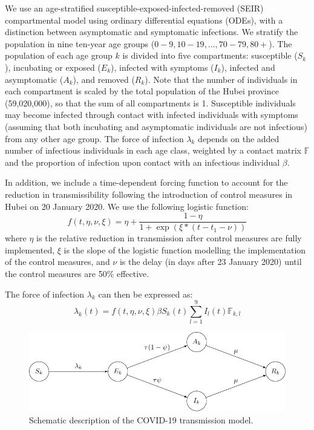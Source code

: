 \documentclass{article}
\begin{document}
We use an age-stratified susceptible-exposed-infected-removed (SEIR) compartmental model using ordinary differential equations (ODEs), with a distinction between asymptomatic and symptomatic infections. 
We stratify the population in nine ten-year age groups ($0-9, 10-19, \ldots, 70-79, 80+$). 
The population of each age group $k$ is divided into five compartments: susceptible ($S_k$), incubating or exposed ($E_k$), infected with symptoms ($I_k$), infected and asymptomatic ($A_k$), and removed ($R_k$).
Note that the number of individuals in each compartment is scaled by the total population of the Hubei province (59,020,000), so that the sum of all compartments is 1.
Susceptible individuals may become infected through contact with infected individuals with symptoms (assuming that both incubating and asymptomatic individuals are not infectious) from any other age group.
The force of infection $\lambda_k$ depends on the added number of infectious individuals in each age class, weighted by a contact matrix $\mathds{F}$ and the proportion of infection upon contact with an infectious individual $\beta$.

In addition, we include a time-dependent forcing function to account for the reduction in transmissibility following the introduction of control measures in Hubei on 20 January 2020.
We use the following logistic function:
\begin{equation}
f(t,\eta,\nu, \xi) = \eta + \frac{1-\eta}{1+\exp(\xi *(t-t_1-\nu))}
\end{equation}
where $\eta$ is the relative reduction in transmission after control measures are fully implemented, $\xi$ is the slope of the logistic function modelling the implementation of the control measures, and $\nu$ is the delay (in days after 23 January 2020) until the control measures are 50\% effective.

The force of infection $\lambda_k$ can then be expressed as:
\begin{equation}
\lambda_k(t) = f(t,\eta,\nu, \xi) \beta S_k(t) \sum_{l=1}^9  I_l(t)  \mathds{F}_{k,l} 
\end{equation}

\begin{figure}[H]
	\centering
	\includegraphics[width=.7\linewidth]{../figures/fig_ode.pdf}
	\caption{Schematic description of the COVID-19 transmission model.}
	\label{fig:ode}
\end{figure}
\end{document}
